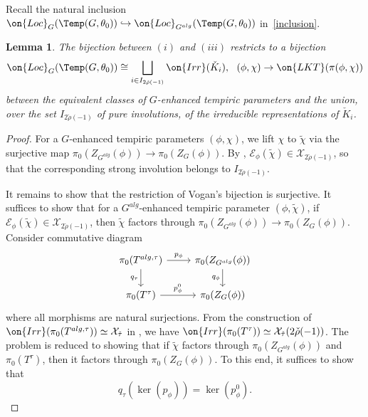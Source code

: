 \documentclass[12pt]{amsart}
\newtheorem{lem}[thm]{Lemma}
\theoremstyle{remark}
\begin{document}
Recall the natural inclusion 
$\on{Loc}_{G}(\Temp(G,\theta_0))\hookrightarrow \on{Loc}_{G^{alg}}(\Temp(G,\theta_0))$
in~\eqref{inclusion}.
   
\begin{lem}\label{pure}
   The bijection between $(i)$ and $(iii)$
   restricts to a bijection 
   \[\on{Loc}_{G}(\Temp(G,\theta_0))\cong\bigsqcup_{i\in I_{2\check\rho(-1)}}\on{Irr}(\check K_i), \ \ (\phi,\chi)\to\on{LKT}(\pi(\phi,\chi))\]
 between the equivalent classes of $G$-enhanced tempiric parameters and the union, over the set $I_{2\check\rho(-1)}$ of
 pure involutions, 
 of the irreducible representations of $\check K_i$.
\end{lem}
\begin{proof}
    For a $G$-enhanced tempiric parameters $(\phi,\chi)$,
    we lift $\chi$ to $\tilde\chi$ via the surjective map
    $\pi_0(Z_{G^{alg}}(\phi))\rightarrow\pi_0(Z_G(\phi))$.
    By \cite[Proposition 4.17]{AA},
    $\mathcal{E}_\phi(\tilde\chi)\in\mathcal{X}_{2\check\rho(-1)}$,
    so that the corresponding strong involution belongs to $I_{2\check\rho(-1)}$.

    It remains to show that the restriction of Vogan's bijection
    is surjective.
    It suffices to show that for a 
    $G^{alg}$-enhanced tempiric parameter $(\phi,\tilde\chi)$,
    if $\mathcal{E}_\phi(\tilde\chi)\in\mathcal{X}_{2\check\rho(-1)}$,
    then $\tilde\chi$ factors through 
    $\pi_0(Z_{G^{alg}}(\phi))\rightarrow\pi_0(Z_G(\phi))$.
    Consider commutative diagram
    \[\begin{tikzcd}
    {\pi_0(T^{alg,\tau})} \arrow[r, "p_\phi"] \arrow[d, "q_\tau"'] & \pi_0(Z_{G^{alg}}(\phi)) \arrow[d, "q_\phi"'] \\
    \pi_0(T^\tau) \arrow[r, "p_\phi^0"]                            & \pi_0(Z_G(\phi))                             
    \end{tikzcd}\]
   where all morphisms are natural surjections.
   From the construction of 
   $\on{Irr}(\pi_0(T^{alg,\tau}))\simeq\mathcal{X}_{\check\tau}$
   in \cite[Lemma 4.10, \S4.3]{AA},
   we have
   $\on{Irr}(\pi_0(T^\tau))\simeq\mathcal{X}_{\check\tau}(2\check\rho(-1))$.
   The problem is reduced to showing that if $\tilde\chi$
   factors through $\pi_0(Z_{G^{alg}}(\phi))$
   and $\pi_0(T^\tau)$,
   then it factors through $\pi_0(Z_G(\phi))$.
   To this end, it suffices to show that
   \begin{equation}\label{eq:ker comparison}
   q_\tau(\ker(p_\phi))=\ker(p_\phi^0).
   \end{equation}


\end{proof}
\end{document}
